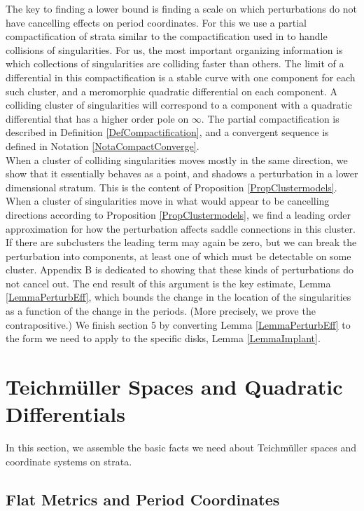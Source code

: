 \documentclass[12pt]{article}
\begin{document}
\noindent The key to finding a lower bound is finding a scale on which perturbations do not have cancelling effects on period coordinates. For this we use a partial compactification of strata similar to the compactification used in \cite{5guys} to handle collisions of singularities. For us, the most important organizing information is which collections of singularities are colliding faster than others. The limit of a differential in this compactification is a stable curve with one component for each such cluster, and a meromorphic quadratic differential on each component. A colliding cluster of singularities will correspond to a component with a quadratic differential that has a higher order pole on $\infty$. The partial compactification is described in Definition \ref{DefCompactification}, and a convergent sequence is defined in Notation \ref{NotaCompactConverge}.\\

\noindent When a cluster of colliding singularities moves mostly in the same direction, we show that it essentially behaves as a point, and shadows a perturbation in a lower dimensional stratum. This is the content of Proposition \ref{PropClustermodels}. When a cluster of singularities move in what would appear to be cancelling directions according to Proposition \ref{PropClustermodels}, we find a leading order approximation for how the perturbation affects saddle connections in this cluster. If there are subclusters the leading term may again be zero, but we can break the perturbation into components, at least one of which must be detectable on some cluster. Appendix B is dedicated to showing that these kinds of perturbations do not cancel out. The end result of this argument is the key estimate, Lemma \ref{LemmaPerturbEff}, which bounds the change in the location of the singularities as a function of the change in the periods. (More precisely, we prove the contrapositive.) We finish section 5 by converting Lemma \ref{LemmaPerturbEff} to the form we need to apply to the specific disks, Lemma \ref{LemmaImplant}.

\section{Teichm\"uller Spaces and Quadratic Differentials}

\noindent In this section, we assemble the basic facts we need about Teichm\"uller spaces and coordinate systems on strata.

\subsection{Flat Metrics and Period Coordinates}
\end{document}
